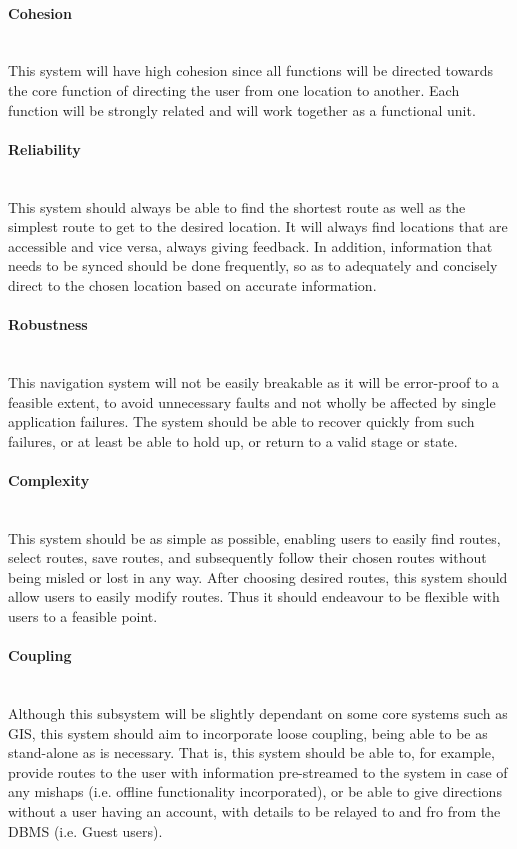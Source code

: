 	\paragraph{Cohesion}
	\mbox{}\\
	This system will have high cohesion since all functions will be directed towards the core
	 function of directing the user from one location to another. Each function will be
	  strongly related and will work together as a functional unit.
	  
	\paragraph{Reliability}
	\mbox{}\\
	This system should always be able to find the shortest route as well as the simplest route 
	to get to the desired location. It will always find locations that are accessible and vice 
	versa, always giving feedback. In addition, information that needs to be synced should be done
	frequently, so as to adequately and concisely direct to the chosen location based on accurate
	information. 
	
	\paragraph{Robustness}
	\mbox{}\\
	This navigation system will not be easily breakable as it will be error-proof to a feasible 
	extent, to avoid unnecessary faults and not wholly be affected by single application failures. 
	The system should be able to recover quickly from such failures, or at least be able to 
	hold up, or return to a valid stage or state.
	
	\paragraph{Complexity}
	\mbox{}\\
	This system should be as simple as possible, enabling users to easily find routes, select routes,
	save routes, and subsequently follow their chosen routes without being misled or lost in any way.  
	After choosing desired routes, this system should allow users to easily modify routes. Thus it should
	endeavour to be flexible with users to a feasible point.
	
	\paragraph{Coupling}
	\mbox{}\\
	Although this subsystem will be slightly dependant on some core systems such as GIS, this system
	should aim to incorporate loose coupling, being able to be as stand-alone as is necessary. 
	That is, this system should be able to, for example, provide routes to the user with information 
	pre-streamed to the system in case of any mishaps (i.e. offline functionality incorporated),
	or be able to give directions without a user having an account, with details to be relayed to and 
	fro from the DBMS (i.e. Guest users).
	
